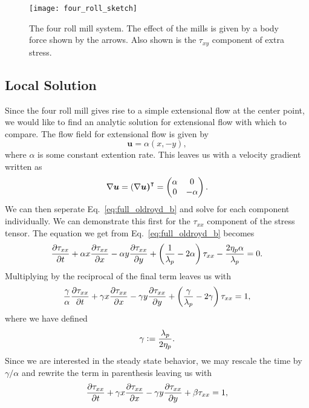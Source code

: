 \begin{figure}[t]
	\centering
	\texttt{[image: four\_roll\_sketch]}
	\caption{The four roll mill system. The effect of the mills is given by a body force shown by the arrows. Also shown is the $\tau_{xy}$ component of extra stress.}
	\label{fig:four_roll_sketch}
\end{figure}

\subsection{Local Solution}
Since the four roll mill gives rise to a simple extensional flow at the center point, we would like to find an analytic solution for extensional flow with which to compare. The flow field for extensional flow is given by
\begin{equation}
\bm{u} = \alpha(x, -y),
\end{equation}
where $\alpha$ is some constant extention rate. This leaves us with a velocity gradient written as
\begin{equation}
\nabla\bm{u} = \left(\nabla \bm{u\right)}^\intercal = 
\begin{pmatrix}
\alpha & 0 \\
0 & -\alpha
\end{pmatrix}.
\end{equation}
We can then seperate Eq.~\eqref{eq:full_oldroyd_b} and solve for each component individually. We can demonstrate this first for the $\tau_{xx}$ component of the stress tensor. The equation we get from Eq.~\eqref{eq:full_oldroyd_b} becomes
\begin{equation}
\frac{\partial \tau_{xx}}{\partial t} + \alpha x \frac{\partial \tau_{xx}}{\partial x} - \alpha y \frac{\partial \tau_{xx}}{\partial y} + \left( \frac{1}{\lambda_p} - 2\alpha \right) \tau_{xx} - \frac{2\eta_p \alpha}{\lambda_p} = 0.
\end{equation}
Multiplying by the reciprocal of the final term leaves us with
\begin{equation}
\frac{\gamma}{\alpha} \frac{\partial \tau_{xx}}{\partial t} + \gamma x \frac{\partial \tau_{xx}}{\partial x} - \gamma y \frac{\partial \tau_{xx}}{\partial y} +\left( \frac{\gamma}{\lambda_p} - 2\gamma\right) \tau_{xx} =1,
\end{equation}
where we have defined
\begin{equation}
\gamma \vcentcolon= \frac{\lambda_p}{2 \eta_p}.
\end{equation}
Since we are interested in the steady state behavior, we may rescale the time by $\gamma/\alpha$ and 
rewrite the term in parenthesis leaving us with
\begin{equation}
\frac{\partial \tau_{xx}}{\partial t} + \gamma x \frac{\partial \tau_{xx}}{\partial x} - \gamma y \frac{\partial \tau_{xx}}{\partial y} + \beta \tau_{xx} = 1,
\end{equation}
